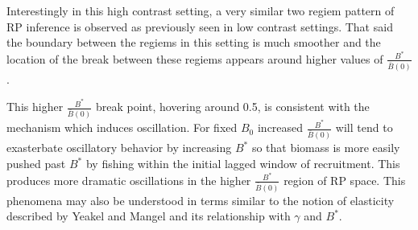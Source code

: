 %
Interestingly in this high contrast setting, a very similar two regiem pattern
of RP inference is observed as previously seen in low contrast settings.
That said the boundary between the regiems in this setting is much smoother
and the location of the break between these regiems appears around higher values of
$\frac{B^*}{\bar B(0)}$. %


%
This higher $\frac{B^*}{\bar B(0)}$ break point, hovering around 0.5, is
consistent with the mechanism which induces oscillation. 
For fixed $B_0$ increased $\frac{B^*}{\bar B(0)}$ will tend to exasterbate oscillatory behavior 
by increasing $B^*$ so that biomass is more easily pushed past $B^*$ by fishing
within the initial lagged window of recruitment. This produces more dramatic 
oscillations in the higher $\frac{B^*}{\bar B(0)}$ region of RP space. This 
phenomena may also be understood in terms similar to the notion of elasticity 
described by Yeakel and Mangel \cite{yeakel_generalized_2015} and its relationship 
with $\gamma$ and $B^*$.

%

